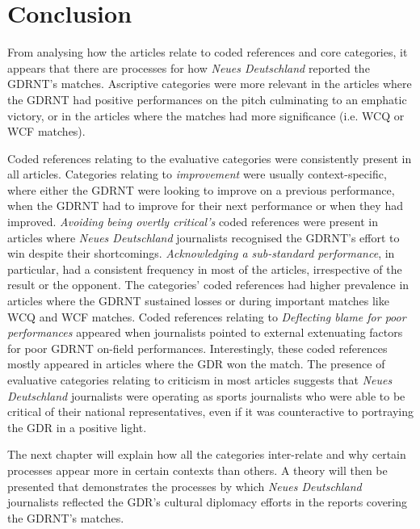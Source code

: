 \section*{Conclusion}

From analysing how the articles relate to coded references and core categories, it appears that there are processes for how \textit{Neues Deutschland} reported the GDRNT’s matches. Ascriptive categories were more relevant in the articles where the GDRNT had positive performances on the pitch culminating to an emphatic victory, or in the articles where the matches had more significance (i.e. WCQ or WCF matches).

Coded references relating to the evaluative categories were consistently present in all articles. Categories relating to \textit{improvement} were usually context-specific, where either the GDRNT were looking to improve on a previous performance, when the GDRNT had to improve for their next performance or when they had improved. \textit{Avoiding being overtly critical’s} coded references were present in articles where \textit{Neues Deutschland} journalists recognised the GDRNT’s effort to win despite their shortcomings. \textit{Acknowledging a sub-standard performance}, in particular, had a consistent frequency in most of the articles, irrespective of the result or the opponent. The categories’ coded references had higher prevalence in articles where the GDRNT sustained losses or during important matches like WCQ and WCF matches. Coded references relating to \textit{Deflecting blame for poor performances} appeared when journalists pointed to external extenuating factors for poor GDRNT on-field performances. Interestingly, these coded references mostly appeared in articles where the GDR won the match. The presence of evaluative categories relating to criticism in most articles suggests that \textit{Neues Deutschland} journalists were operating as sports journalists who were able to be critical of their national representatives, even if it was counteractive to portraying the GDR in a positive light.

The next chapter will explain how all the categories inter-relate and why certain processes appear more in certain contexts than others. A theory will then be presented that demonstrates the processes by which \textit{Neues Deutschland} journalists reflected the GDR’s cultural diplomacy efforts in the reports covering the GDRNT’s matches.